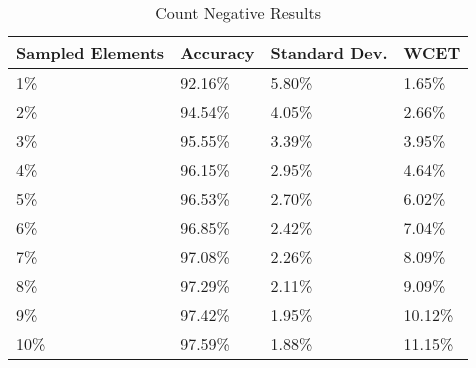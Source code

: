 \begin{table}[]
  \centering
  \caption{Count Negative Results}
  \label{countnegativeT}
  \begin{tabular}{|l|l|l|l|}
    \hline
    \textbf{Sampled Elements} & \textbf{Accuracy}  & \textbf{Standard Dev.}  & \textbf{WCET}           \\ \hline
1\% &  92.16\% &5.80\% &1.65\%   \\ \hline
2\% &  94.54\% &4.05\% &2.66\%   \\ \hline
3\% &  95.55\% &3.39\% &3.95\%   \\ \hline
4\% &  96.15\% &2.95\% &4.64\%   \\ \hline
5\% &  96.53\% &2.70\% &6.02\%   \\ \hline
6\% &  96.85\% &2.42\% &7.04\%   \\ \hline
7\% &  97.08\% &2.26\% &8.09\%   \\ \hline
8\% &  97.29\% &2.11\% &9.09\%   \\ \hline
9\% &  97.42\% &1.95\% &10.12\%   \\ \hline
10\% &  97.59\% &1.88\% &11.15\%   \\ \hline
  \end{tabular}
\end{table}
